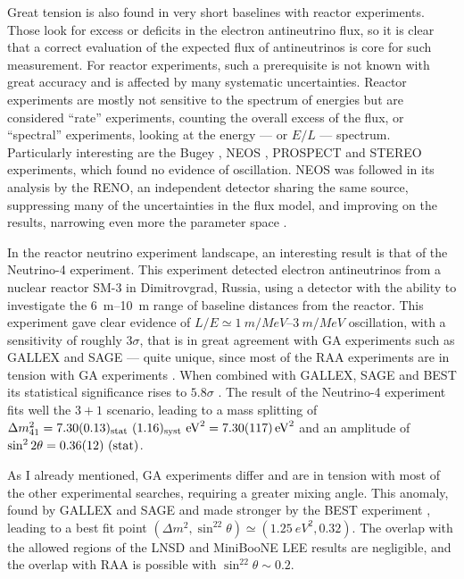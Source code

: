 Great tension is also found in very short baselines with reactor experiments. Those look for excess or deficits in the electron antineutrino flux, so it is clear that a correct evaluation of the expected flux of antineutrinos is core for such measurement. For reactor experiments, such a prerequisite is not known with great accuracy and is affected by many systematic uncertainties. Reactor experiments are mostly not sensitive to the spectrum of energies but are considered ``rate'' experiments, counting the overall excess of the flux, or ``spectral'' experiments, looking at the energy --- or $E/L$ --- spectrum. Particularly interesting are the Bugey \cite{declaisSearchNeutrinoOscillations1995}, NEOS \cite{koSterileNeutrinoSearch2017}, PROSPECT \cite{andriamiradoImprovedShortBaselineNeutrino2020} and STEREO \cite{almazanSTEREONeutrinoSpectrum2023} experiments, which found no evidence of oscillation. NEOS was followed in its analysis by the RENO, an independent detector sharing the same source, suppressing many of the uncertainties in the flux model, and improving on the results, narrowing even more the parameter space \cite{atifSearchSterileNeutrino2022}. 

In the reactor neutrino experiment landscape, an interesting result is that of the Neutrino-4 experiment. This experiment detected electron antineutrinos from a nuclear reactor SM-3 in Dimitrovgrad, Russia, using a detector with the ability to investigate the \qtyrange{6}{10}{m} range of baseline distances from the reactor. This experiment gave clear evidence of $L/E \simeq \qtyrange{1}{3}{m/MeV}$ oscillation, with a sensitivity of roughly $3\sigma$, that is in great agreement with GA experiments such as GALLEX and SAGE --- quite unique, since most of the RAA experiments are in tension with GA experiments \cite{maltoniEVSterileNeutrinos2024}. When combined with GALLEX, SAGE and BEST its statistical significance rises to $5.8\sigma$ \cite{serebrovResultNeutrino4Experiment2023}. The result of the Neutrino-4 experiment fits well the $3+1$ scenario, leading to a mass splitting of $\Delta m^2_{41} = \mathrm{7.30 (0.13)_{stat}\ (1.16)_{syst}}\ \si{eV^2} = \SI{7.30+-1.17}{eV^2}$ and an amplitude of $\sin^22\theta = \num{0.36\pm0.12}\mathrm{\ (stat)}$. 

As I already mentioned, GA experiments differ and are in tension with most of the other experimental searches, requiring a greater mixing angle. This anomaly, found by GALLEX and SAGE and made stronger by the BEST experiment \cite{giuntiGalliumAnomalyCritical2022}, leading to a best fit point $(\Delta m^2, \sin^22\theta) \simeq (\SI{1.25}{eV^2}, \num{0.32})$. The overlap with the allowed regions of the LNSD and MiniBooNE LEE results are negligible, and the overlap with RAA is possible with $\sin^22\theta\sim0.2$. 

